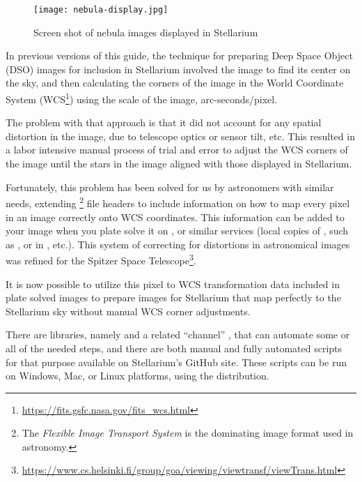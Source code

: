 \begin{figure}[htb]
\centering\texttt{[image: nebula-display.jpg]}
\caption{Screen shot of nebula images displayed in Stellarium}
\label{fig:dso:adding_images}
\end{figure}

\noindent In previous versions of this guide, the technique for preparing Deep
Space Object (DSO) images for inclusion in Stellarium involved  the image to find its center on the sky, and then calculating
the corners of the image in the World Coordinate System (WCS\footnote{%
\url{https://fits.gsfc.nasa.gov/fits_wcs.html}}) using the scale of the
image, arc-seconds/pixel.


The problem with that approach is that it did not account for any
spatial distortion in the image, due to telescope optics or sensor
tilt, etc. This resulted in a labor intensive manual process of trial
and error to adjust the WCS corners of the image until the stars in
the image aligned with those displayed in Stellarium.

Fortunately, this problem has been solved for us by astronomers with
similar needs, extending \footnote{The \emph{Flexible Image
    Transport System} is the dominating image format used in
  astronomy.} file headers to include information on how
to map every pixel in an image correctly onto WCS coordinates. This
information can be added to your image when you plate solve it on
, or similar services (local copies of
, such as , or in
, etc.). This system of correcting for distortions
in astronomical images was refined for the Spitzer
Space Telescope\footnote{\url{https://www.cs.helsinki.fi/group/goa/viewing/viewtransf/viewTrans.html}}.

It is now possible to utilize this pixel to WCS transformation data
included in plate solved images to prepare images for Stellarium that
map perfectly to the Stellarium sky without manual WCS corner
adjustments.

There are  libraries, namely  and a
related ``channel'' , that can automate some or
all of the needed steps, and there are both manual and fully automated
scripts for that purpose available on Stellarium's GitHub site. These
scripts can be run on Windows, Mac, or Linux platforms, using the
 distribution.

